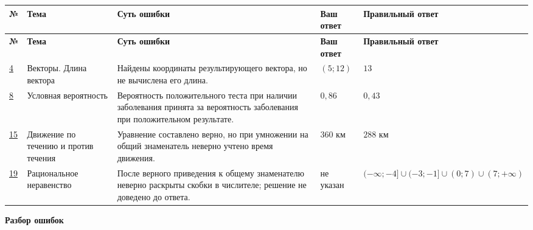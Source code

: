 \documentclass[12pt,a4paper]{article}
\begin{document}
\begin{longtable}{
    >{\centering\arraybackslash}p{0.8cm}
    p{3.0cm}
    p{4.0cm}
    p{2.2cm}
    p{4.1cm}
}
\toprule
\textbf{№} &
\textbf{Тема} &
\textbf{Суть ошибки} &
\textbf{Ваш ответ} &
\textbf{Правильный ответ}
\\
\midrule
\endfirsthead

\toprule
\textbf{№} &
\textbf{Тема} &
\textbf{Суть ошибки} &
\textbf{Ваш ответ} &
\textbf{Правильный ответ}
\\
\midrule
\endhead

\hyperref[task:4]{4}
&
Векторы. Длина вектора
&
Найдены координаты результирующего вектора, но не вычислена его длина.
&
$(5;12)$
&
$13$
\\

\addlinespace

\hyperref[task:8]{8}
&
Условная вероятность
&
Вероятность положительного теста при наличии заболевания принята за вероятность заболевания при положительном результате.
&
$0{,}86$
&
$0{,}43$
\\

\addlinespace

\hyperref[task:15]{15}
&
Движение по течению и против течения
&
Уравнение составлено верно, но при умножении на общий знаменатель неверно учтено время движения.
&
$360$ км
&
$288$ км
\\

\addlinespace

\hyperref[task:19]{19}
&
Рациональное неравенство
&
После верного приведения к общему знаменателю неверно раскрыты скобки в числителе; решение не доведено до ответа.
&
не указан
&
\(\displaystyle
(-\infty;-4]\cup(-3;-1]\cup(0;7)\cup(7;+\infty)
\)
\\

\bottomrule
\end{longtable}

\normalsize

\newpage

\thispagestyle{empty}

\vspace*{\fill}

\begin{center}
{\LARGE\bfseries Разбор ошибок}
\end{center}

\vspace*{\fill}

\end{document}
